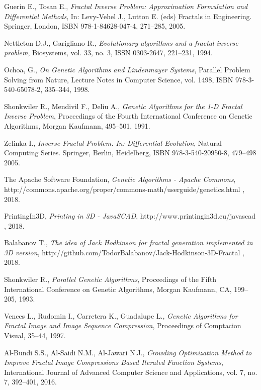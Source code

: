 \documentclass[runningheads]{llncs}
\begin{document}
\begin{thebibliography}{99}

 Guerin E., Tosan E., \textit{Fractal Inverse Problem: Approximation Formulation and Differential Methods}, In: Levy-Vehel J., Lutton E. (eds) Fractals in Engineering. Springer, London, ISBN 978-1-84628-047-4, 271--285, 2005.

 Nettleton D.J., Garigliano R., \textit{Evolutionary algorithms and a fractal inverse problem}, Biosystems, vol. 33, no. 3, ISSN 0303-2647, 221--231, 1994.

 Ochoa, G., \textit{On Genetic Algorithms and Lindenmayer Systems}, Parallel Problem Solving from Nature, Lecture Notes in Computer Science, vol. 1498, ISBN 978-3-540-65078-2, 335--344, 1998.

 Shonkwiler R., Mendivil F., Deliu A., \textit{Genetic Algorithms for the 1-D Fractal Inverse Problem}, Proceedings of the Fourth International Conference on Genetic Algorithms, Morgan Kaufmann, 495--501, 1991.

 Zelinka I., \textit{Inverse Fractal Problem. In: Differential Evolution}, Natural Computing Series. Springer, Berlin, Heidelberg, ISBN 978-3-540-20950-8, 479--498 2005.

 The Apache Software Foundation, \textit{Genetic Algorithms - Apache Commons}, http://commons.apache.org/proper/commons-math/userguide/genetics.html , 2018.

 PrintingIn3D, \textit{Printing in 3D - JavaSCAD}, http://www.printingin3d.eu/javascad , 2018.

 Balabanov T., \textit{The idea of Jack Hodkinson for fractal generation implemented in 3D version}, http://github.com/TodorBalabanov/Jack-Hodkinson-3D-Fractal , 2018.

 Shonkwiler R., \textit{Parallel Genetic Algorithms}, Proceedings of the Fifth International Conference on Genetic Algorithms, Morgan Kaufmann, CA, 199--205, 1993.

 Vences L., Rudomin I., Carretera K., Guadalupe L., \textit{Genetic Algorithms for Fractal Image and Image Sequence Compression},  
Proceedings of Comptacion Visual, 35--44, 1997.

 Al-Bundi S.S., Al-Saidi N.M., Al-Jawari N.J., \textit{Crowding Optimization Method to Improve Fractal Image Compressions Based Iterated Function Systems}, International Journal of Advanced Computer Science and Applications, vol. 7, no. 7, 392--401, 2016.

\end{thebibliography}
\end{document}
